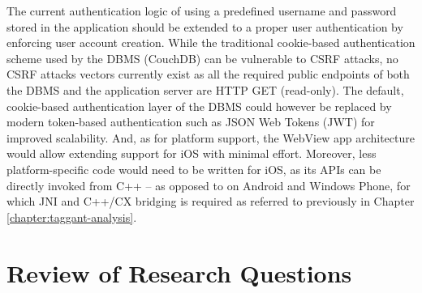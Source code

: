 \documentclass[thesis.tex]{subfiles}
\begin{document}
The current authentication logic of using a predefined username and password stored in the application should be extended to a proper user authentication by enforcing user account creation. While the traditional cookie-based authentication scheme used by the DBMS (CouchDB) can be vulnerable to CSRF attacks, no CSRF attacks vectors currently exist as all the required public endpoints of both the DBMS and the application server are HTTP GET (read-only). The default, cookie-based authentication layer of the DBMS could however be replaced by modern token-based authentication such as JSON Web Tokens (JWT) for improved scalability. And, as for platform support, the WebView app architecture would allow extending support for iOS with minimal effort. Moreover, less platform-specific code would need to be written for iOS, as its APIs can be directly invoked from C++ -- as opposed to on Android and Windows Phone, for which JNI and C++/CX bridging is required as referred to previously in Chapter \ref{chapter:taggant-analysis}.

\clearpage
\section{Review of Research Questions}
\end{document}
